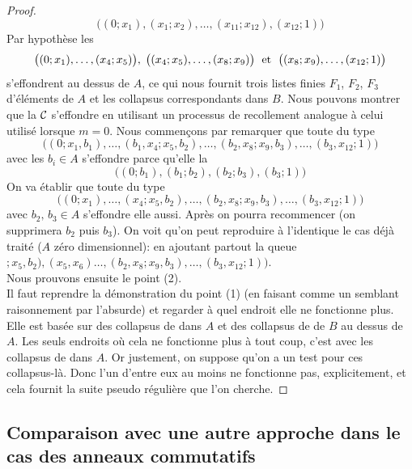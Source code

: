 \begin{proof}
$$\big((0;x_1),(x_1;x_2),\ldots, (x_{11};x_{12}),(x_{12};1)\big) 
$$
Par hypothèse les \procs
$$\begin{array}{cl} 
\big((0;x_1),\ldots,(x_4;x_5)\big),  \; 
\big((x_4;x_5), \ldots,(x_8;x_9)\big) \; \hbox{ et }\;
\big((x_8;x_9),\ldots, (x_{12};1)\big)
\end{array}$$
s'effondrent au dessus de $A$, ce qui nous fournit trois listes finies 
$F_1$, $F_2$, $F_3$  d'éléments de $A$ et les collapsus correspondants 
dans $B$.
Nous pouvons montrer que la \proc ${\cal C}$ s'effondre en utilisant un processus 
de recollement analogue à celui utilisé lorsque $m=0$.
Nous commençons par remarquer que toute \proc du type
$$ \big((0;x_1,b_1),\ldots, (b_1,x_4;x_5,b_2),
 \ldots, (b_2,x_8;x_9,b_3),\ldots, (b_3,x_{12};1)\big)
$$
avec les $b_i\in A$ s'effondre parce qu'elle  la \proc
$$ \big((0;b_1),(b_1;b_2), (b_2;b_3), (b_3;1)\big)
$$
On va établir que toute \proc du type 
$$ \big((0;x_1),\ldots, (x_4;x_5,b_2),
 \ldots, (b_2,x_8;x_9,b_3),\ldots, (b_3,x_{12};1)\big)
$$
avec $b_2,\,b_3\in A$ s'effondre elle aussi. Après on pourra recommencer 
(on supprimera $b_2$ puis $b_3$). On voit qu'on peut reproduire à 
l'identique le cas déjà traité ($A$ zéro dimensionnel): en 
ajoutant partout la queue $;x_5,b_2),(x_5,x_6) \ldots, 
(b_2,x_8;x_9,b_3),\ldots, (b_3,x_{12};1))$.\\
Nous prouvons ensuite le point (2).\\
Il faut reprendre la démonstration du point (1) (en faisant comme un semblant 
raisonnement par l'absurde) et regarder à quel endroit elle ne fonctionne  
plus. Elle est basée sur des collapsus de \proels dans $A$ et des 
collapsus de \proels de $B$ au dessus de $A$.
Les seuls endroits où cela ne fonctionne plus à tout coup, c'est avec les 
collapsus de \proels dans $A$. Or justement, on suppose qu'on a un test 
pour ces collapsus-là. Donc l'un d'entre eux au moins ne fonctionne pas, 
explicitement, et cela fournit la suite pseudo régulière que l'on 
cherche.
\end{proof}


\subsection{Comparaison avec une autre approche \cov dans le cas des anneaux commutatifs} 

